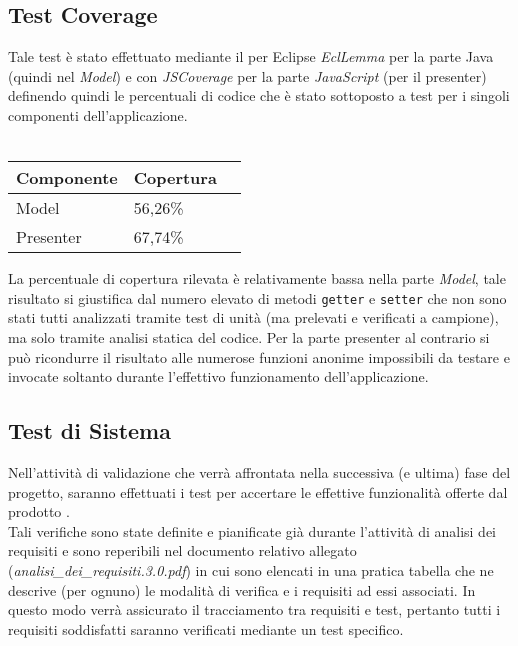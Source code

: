 \subsection{Test Coverage}
Tale test è stato effettuato mediante il \underline{} per Eclipse \textit{EclLemma} per la parte Java (quindi nel \textit{Model}) e con \textit{JSCoverage} per la parte \textit{JavaScript} (per il presenter) definendo quindi le percentuali di codice che è stato sottoposto a test per i singoli componenti dell'applicazione.\\\\

\begin{center}
\begin{longtable}{p{}ll}
\toprule Componente & Copertura\\
\midrule
Model & 56,26\%\\
Presenter & 67,74\% \\
\bottomrule
\end{longtable}
\end{center}

La percentuale di copertura rilevata è relativamente bassa nella parte \textit{Model}, tale risultato si giustifica dal numero elevato di metodi \texttt{getter} e \texttt{setter} che non sono stati tutti analizzati tramite test di unità (ma prelevati e verificati a campione), ma solo tramite analisi statica del codice. Per la parte presenter al contrario si può ricondurre il risultato alle numerose funzioni anonime impossibili da testare e invocate soltanto durante l'effettivo funzionamento dell'applicazione.

\subsection{Test di Sistema}
Nell'attività di validazione che verrà affrontata nella successiva (e ultima) fase del progetto, saranno effettuati i test per accertare le effettive funzionalità offerte dal prodotto \caName.\\ Tali verifiche sono state definite e pianificate già durante l'attività di analisi dei requisiti e sono reperibili nel documento relativo allegato (\textit{analisi\_dei\_requisiti.3.0.pdf}) in cui sono elencati in una pratica tabella che ne descrive (per ognuno) le modalità di verifica e i requisiti ad essi associati. In questo modo verrà assicurato il tracciamento tra requisiti e test, pertanto tutti i requisiti soddisfatti saranno verificati mediante un test specifico.

